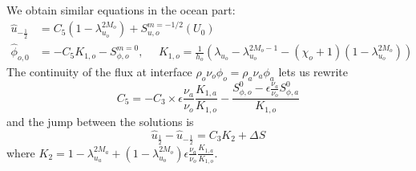 We obtain similar equations in the ocean part:
\begin{equation}
	\begin{aligned}
		\widehat{u}_{-\frac{1}{2}} &= {C}_5 (1 -
			\lambda_{u_o}^{2M_o})
			+ S_{u, o}^{m=-1/2}(U_0) \\
		\widehat{\phi}_{o,0} &= - {C}_5 K_{1,o}
		-S_{\phi,o}^{m=0},
		~~~~~~ K_{1,o} = \frac{1}{h_o}
		\left(
			\lambda_{u_o}-\lambda_{u_o}^{2M_o-1}
			- (\chi_o+1)(1-\lambda_{u_o}^{2M_o})
		\right)
	\end{aligned}
\end{equation}
The continuity of the flux at interface
$\rho_o \nu_o \phi_o = \rho_a \nu_a \phi_a$ lets us rewrite
\begin{equation}
{C}_5 = - {C}_3 \times \epsilon
	\frac{\nu_a}{\nu_o} \frac{K_{1,a}}{K_{1,o}} -
	\frac{S_{\phi,o}^0 - \epsilon \frac{\nu_a}{\nu_o}
	S^0_{\phi, a}}{K_{1,o}}
\end{equation}
and the jump between the solutions is
\begin{equation}
	\widehat{u}_{\frac{1}{2}} - \widehat{u}_{-\frac{1}{2}}
	= {C}_3 K_{2} + \Delta S
\end{equation}
where $K_{2} = 1 - \lambda_{u_a}^{2M_a} + (1 - \lambda_{u_o}^{2M_o})
\epsilon \frac{\nu_a}{\nu_o} \frac{K_{1,a}}{K_{1,o}}$.
